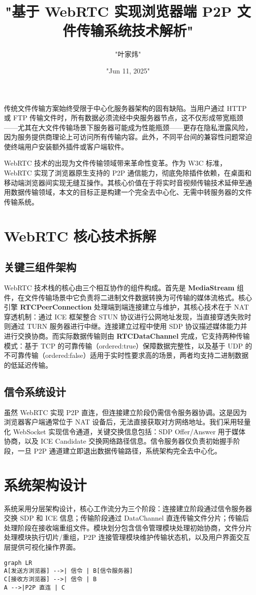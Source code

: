 \title{"基于 WebRTC 实现浏览器端 P2P 文件传输系统技术解析"}
\author{"叶家炜"}
\date{"Jun 11, 2025"}
\maketitle
传统文件传输方案始终受限于中心化服务器架构的固有缺陷。当用户通过 HTTP 或 FTP 传输文件时，所有数据必须流经中央服务器节点，这不仅形成带宽瓶颈——尤其在大文件传输场景下服务器可能成为性能瓶颈——更存在隐私泄露风险，因为服务提供商理论上可访问所有传输内容。此外，不同平台间的兼容性问题常迫使终端用户安装额外插件或客户端软件。\par
WebRTC 技术的出现为文件传输领域带来革命性变革。作为 W3C 标准，WebRTC 实现了浏览器原生支持的 P2P 通信能力，彻底免除插件依赖，在桌面和移动端浏览器间实现无缝互操作。其核心价值在于将实时音视频传输技术延伸至通用数据传输领域，本文的目标正是构建一个完全去中心化、无需中转服务器的文件传输系统。\par
\chapter{WebRTC 核心技术拆解}
\section{关键三组件架构}
WebRTC 技术栈的核心由三个相互协作的组件构成。首先是 \textbf{MediaStream} 组件，在文件传输场景中它负责将二进制文件数据转换为可传输的媒体流格式。核心引擎 \textbf{RTCPeerConnection} 处理端到端连接建立与维护，其核心技术在于 NAT 穿透机制：通过 ICE 框架整合 STUN 协议进行公网地址发现，当直接穿透失败时则通过 TURN 服务器进行中继。连接建立过程中使用 SDP 协议描述媒体能力并进行交换协商。而实际数据传输则由 \textbf{RTCDataChannel} 完成，它支持两种传输模式：基于 TCP 的可靠传输（ordered:true）保障数据完整性，以及基于 UDP 的不可靠传输（ordered:false）适用于实时性要求高的场景，两者均支持二进制数据的低延迟传输。\par
\section{信令系统设计}
虽然 WebRTC 实现 P2P 直连，但连接建立阶段仍需信令服务器协调。这是因为浏览器客户端通常位于 NAT 设备后，无法直接获取对方网络地址。我们采用轻量化 WebSocket 实现信令通道，关键交换信息包括：SDP Offer/Answer 用于媒体协商，以及 ICE Candidate 交换网络路径信息。信令服务器仅负责初始握手阶段，一旦 P2P 通道建立即退出数据传输路径，系统架构完全去中心化。\par
\chapter{系统架构设计}
系统采用分层架构设计，核心工作流分为三个阶段：连接建立阶段通过信令服务器交换 SDP 和 ICE 信息；传输阶段通过 DataChannel 直连传输文件分片；传输后处理阶段在接收端重组文件。模块划分包含信令管理模块处理初始协商，文件分片处理模块执行切片/重组，P2P 连接管理模块维护传输状态机，以及用户界面交互层提供可视化操作界面。\par
\begin{lstlisting}[language=mermaid]
graph LR
A[发送方浏览器] -->| 信令 | B[信令服务器]
C[接收方浏览器] -->| 信令 | B
A -->|P2P 直连 | C
\end{lstlisting}

